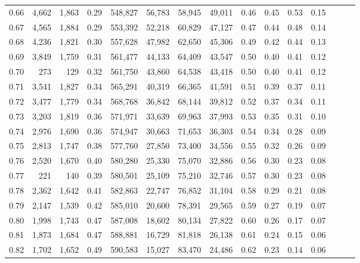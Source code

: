 \begin{tabular}{rrrrrrrrrrrrrrr}
0.66 &   4,662 &  1,863 &  0.29 &  548,827 &   56,783 &   58,945 &   49,011 &  0.46 &  0.45 &  0.53 &      0.15 \\
0.67 &   4,565 &  1,884 &  0.29 &  553,392 &   52,218 &   60,829 &   47,127 &  0.47 &  0.44 &  0.48 &      0.14 \\
0.68 &   4,236 &  1,821 &  0.30 &  557,628 &   47,982 &   62,650 &   45,306 &  0.49 &  0.42 &  0.44 &      0.13 \\
0.69 &   3,849 &  1,759 &  0.31 &  561,477 &   44,133 &   64,409 &   43,547 &  0.50 &  0.40 &  0.41 &      0.12 \\
0.70 &     273 &    129 &  0.32 &  561,750 &   43,860 &   64,538 &   43,418 &  0.50 &  0.40 &  0.41 &      0.12 \\
0.71 &   3,541 &  1,827 &  0.34 &  565,291 &   40,319 &   66,365 &   41,591 &  0.51 &  0.39 &  0.37 &      0.11 \\
0.72 &   3,477 &  1,779 &  0.34 &  568,768 &   36,842 &   68,144 &   39,812 &  0.52 &  0.37 &  0.34 &      0.11 \\
0.73 &   3,203 &  1,819 &  0.36 &  571,971 &   33,639 &   69,963 &   37,993 &  0.53 &  0.35 &  0.31 &      0.10 \\
0.74 &   2,976 &  1,690 &  0.36 &  574,947 &   30,663 &   71,653 &   36,303 &  0.54 &  0.34 &  0.28 &      0.09 \\
0.75 &   2,813 &  1,747 &  0.38 &  577,760 &   27,850 &   73,400 &   34,556 &  0.55 &  0.32 &  0.26 &      0.09 \\
0.76 &   2,520 &  1,670 &  0.40 &  580,280 &   25,330 &   75,070 &   32,886 &  0.56 &  0.30 &  0.23 &      0.08 \\
0.77 &     221 &    140 &  0.39 &  580,501 &   25,109 &   75,210 &   32,746 &  0.57 &  0.30 &  0.23 &      0.08 \\
0.78 &   2,362 &  1,642 &  0.41 &  582,863 &   22,747 &   76,852 &   31,104 &  0.58 &  0.29 &  0.21 &      0.08 \\
0.79 &   2,147 &  1,539 &  0.42 &  585,010 &   20,600 &   78,391 &   29,565 &  0.59 &  0.27 &  0.19 &      0.07 \\
0.80 &   1,998 &  1,743 &  0.47 &  587,008 &   18,602 &   80,134 &   27,822 &  0.60 &  0.26 &  0.17 &      0.07 \\
0.81 &   1,873 &  1,684 &  0.47 &  588,881 &   16,729 &   81,818 &   26,138 &  0.61 &  0.24 &  0.15 &      0.06 \\
0.82 &   1,702 &  1,652 &  0.49 &  590,583 &   15,027 &   83,470 &   24,486 &  0.62 &  0.23 &  0.14 &      0.06 \\

\end{tabular}
